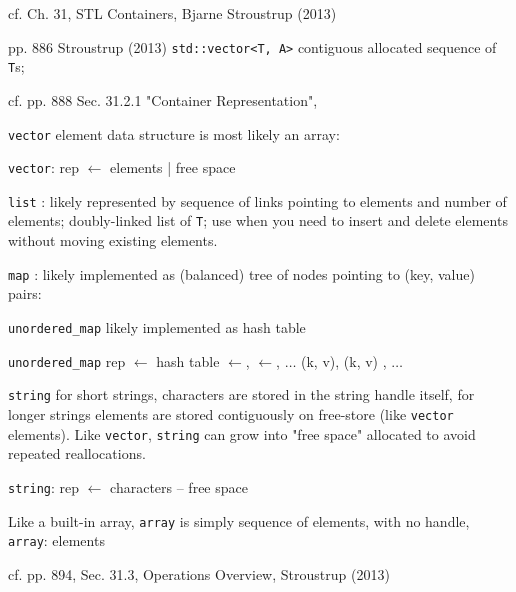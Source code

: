 \documentclass[10pt]{amsart}
\begin{document}
cf. Ch. 31, STL Containers, Bjarne Stroustrup (2013) \cite{Stro2013}

pp. 886 Stroustrup (2013) \cite{Stro2013}
\verb|std::vector<T, A>| contiguous allocated sequence of \verb|T|s;

cf. pp. 888 Sec. 31.2.1 "Container Representation", \cite{Stro2013}

\verb|vector| element data structure is most likely an array:

\verb|vector|: rep $\leftarrow$ elements | free space

\verb|list| : likely represented by sequence of links pointing to elements and number of elements; doubly-linked list of \verb|T|; use when you need to insert and delete elements without moving existing elements.

\verb|map| : likely implemented as (balanced) tree of nodes pointing to (key, value) pairs:

\verb|unordered_map| likely implemented as hash table

\verb|unordered_map| rep $\leftarrow $ hash table $\leftarrow$, $\leftarrow$, $\dots$ (k, v), (k, v) , $\dots$

\verb|string| for short strings, characters are stored in the string handle itself, for longer strings elements are stored contiguously on free-store (like \verb|vector| elements). Like \verb|vector|, \verb|string| can grow into "free space" allocated to avoid repeated reallocations.

\verb|string|: rep $\leftarrow$ characters -- free space

Like a built-in array, \verb|array| is simply sequence of elements, with no handle,
\verb|array|: elements

cf. pp. 894, Sec. 31.3, Operations Overview, Stroustrup (2013) \cite{Stro2013}
\end{document}
